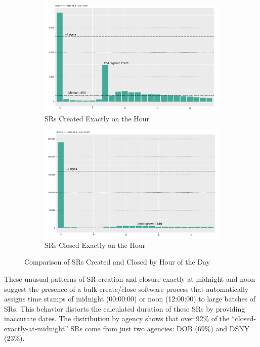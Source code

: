\documentclass[linenumber]{jdsart}
\begin{document}
\begin{figure}[tbp]
    \centering
    \begin{subfigure}{\textwidth}
        \centering
        \includegraphics[width=\textwidth]{2-year-trend_SRs_created_on_the_hour.pdf}
        \caption{SRs Created Exactly on the Hour}
        \label{fig:busiestcreated}
    \end{subfigure}
    \par\medskip
    \begin{subfigure}{\textwidth}
        \centering
        \includegraphics[width=\textwidth]{2-year-trend_SRs_closed_on_the_hour.pdf}
        \caption{SRs Closed Exactly on the Hour}
        \label{fig:busiestclosed}
    \end{subfigure}
    \caption{Comparison of SRs Created and Closed by Hour of the Day}
    \label{fig:stacked}
\end{figure}


These unusual patterns of SR creation and closure exactly at midnight 
and noon suggest the presence of a bulk create/close software process 
that automatically assigns time stamps of midnight (00:00:00) or noon 
(12:00:00) to large batches of SRs. This behavior distorts the 
calculated duration of these SRs by providing inaccurate dates. The 
distribution by agency shows that over 92\% of the ``closed-exactly-at-midnight'' 
SRs come from just two agencies: DOB (69\%) and DSNY  (23\%).
\end{document}
